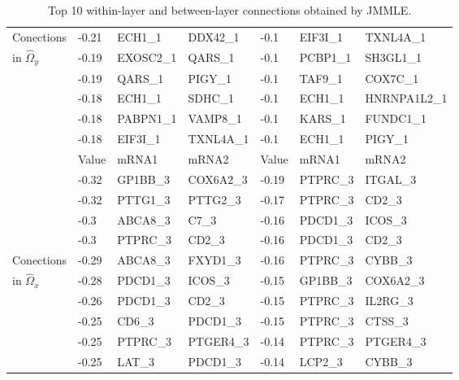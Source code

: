 \begin{table}[t!]
\begin{tabular}{l|lll|lll}
Conections & -0.21 & ECH1\_1    & DDX42\_1  & -0.1  & EIF3I\_1 & TXNL4A\_1    \\
in $\widehat \Omega_y$ & -0.19 & EXOSC2\_1  & QARS\_1   & -0.1  & PCBP1\_1 & SH3GL1\_1    \\
    ~ & -0.19 & QARS\_1    & PIGY\_1   & -0.1  & TAF9\_1  & COX7C\_1     \\
    ~ & -0.18 & ECH1\_1    & SDHC\_1   & -0.1  & ECH1\_1  & HNRNPA1L2\_1 \\
    ~ & -0.18 & PABPN1\_1  & VAMP8\_1  & -0.1  & KARS\_1  & FUNDC1\_1    \\
    ~ & -0.18 & EIF3I\_1   & TXNL4A\_1 & -0.1  & ECH1\_1  & PIGY\_1      \\ \hline
    \hline
    ~ & Value &    mRNA1 & mRNA2     & Value & mRNA1    & mRNA2     \\ \hline
    ~ & -0.32 & GP1BB\_3 & COX6A2\_3 & -0.19 & PTPRC\_3 & ITGAL\_3  \\
    ~ & -0.32 & PTTG1\_3 & PTTG2\_3  & -0.17 & PTPRC\_3 & CD2\_3    \\
    ~ & -0.3  & ABCA8\_3 & C7\_3     & -0.16 & PDCD1\_3 & ICOS\_3   \\
    ~ & -0.3  & PTPRC\_3 & CD2\_3    & -0.16 & PDCD1\_3 & CD2\_3    \\
Conections & -0.29 & ABCA8\_3 & FXYD1\_3  & -0.16 & PTPRC\_3 & CYBB\_3   \\
in $\widehat \Omega_x$ & -0.28 & PDCD1\_3 & ICOS\_3   & -0.15 & GP1BB\_3 & COX6A2\_3 \\
    ~ & -0.26 & PDCD1\_3 & CD2\_3    & -0.15 & PTPRC\_3 & IL2RG\_3  \\
    ~ & -0.25 & CD6\_3   & PDCD1\_3  & -0.15 & PTPRC\_3 & CTSS\_3   \\
    ~ & -0.25 & PTPRC\_3 & PTGER4\_3 & -0.14 & PTPRC\_3 & PTGER4\_3 \\
    ~ & -0.25 & LAT\_3   & PDCD1\_3  & -0.14 & LCP2\_3  & CYBB\_3   \\ \hline
    \end{tabular}
\caption{Top 10 within-layer and between-layer connections obtained by JMMLE.}
\end{table}